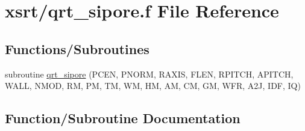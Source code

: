 \hypertarget{qrt__sipore_8f}{}\section{xsrt/qrt\+\_\+sipore.f File Reference}
\label{qrt__sipore_8f}
\subsection*{Functions/\+Subroutines}
\begin{DoxyCompactItemize}
\item 
subroutine \hyperlink{qrt__sipore_8f_aac475c9aed75d8d022268bd6710aa960}{qrt\+\_\+sipore} (P\+C\+EN, P\+N\+O\+RM, R\+A\+X\+IS, F\+L\+EN, R\+P\+I\+T\+CH, A\+P\+I\+T\+CH, W\+A\+LL, N\+M\+OD, RM, PM, TM, WM, HM, AM, CM, GM, W\+FR, A2J, I\+DF, IQ)
\end{DoxyCompactItemize}


\subsection{Function/\+Subroutine Documentation}
\mbox{\label{qrt__sipore_8f_aac475c9aed75d8d022268bd6710aa960}} 
